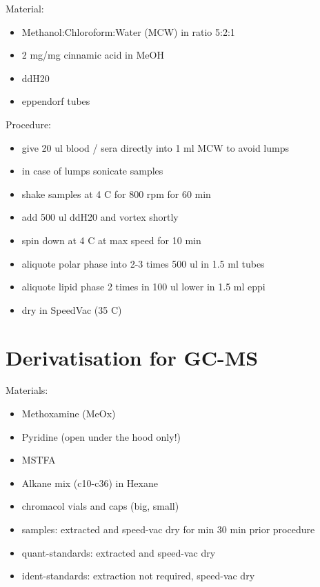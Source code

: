 \documentclass[]{book}
\providecommand{\tightlist}{%
  \setlength{\itemsep}{0pt}\setlength{\parskip}{0pt}}
\begin{document}
Material:

\begin{itemize}
\tightlist
\item
  Methanol:Chloroform:Water (MCW) in ratio 5:2:1
\item
  2 mg/mg cinnamic acid in MeOH
\item
  ddH20
\item
  eppendorf tubes
\end{itemize}

Procedure:

\begin{itemize}
\tightlist
\item
  give 20 ul blood / sera directly into 1 ml MCW to avoid lumps
\item
  in case of lumps sonicate samples
\item
  shake samples at 4 C for 800 rpm for 60 min
\item
  add 500 ul ddH20 and vortex shortly
\item
  spin down at 4 C at max speed for 10 min
\item
  aliquote polar phase into 2-3 times 500 ul in 1.5 ml tubes
\item
  aliquote lipid phase 2 times in 100 ul lower in 1.5 ml eppi
\item
  dry in SpeedVac (35 C)
\end{itemize}

\hypertarget{Deriv}{%
\section{Derivatisation for GC-MS}\label{Deriv}}

Materials:

\begin{itemize}
\tightlist
\item
  Methoxamine (MeOx)
\item
  Pyridine (open under the hood only!)
\item
  MSTFA
\item
  Alkane mix (c10-c36) in Hexane
\item
  chromacol vials and caps (big, small)
\item
  samples: extracted and speed-vac dry for min 30 min prior procedure
\item
  quant-standards: extracted and speed-vac dry
\item
  ident-standards: extraction not required, speed-vac dry
\end{itemize}
\end{document}
